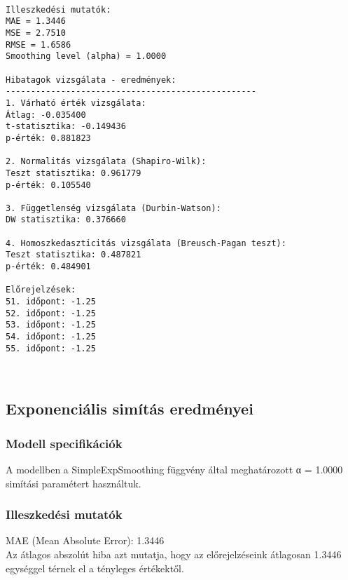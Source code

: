 \documentclass[11pt]{article}
\begin{document}
    \begin{Verbatim}[commandchars=\\\{\}]

Illeszkedési mutatók:
MAE = 1.3446
MSE = 2.7510
RMSE = 1.6586
Smoothing level (alpha) = 1.0000

Hibatagok vizsgálata - eredmények:
--------------------------------------------------
1. Várható érték vizsgálata:
Átlag: -0.035400
t-statisztika: -0.149436
p-érték: 0.881823

2. Normalitás vizsgálata (Shapiro-Wilk):
Teszt statisztika: 0.961779
p-érték: 0.105540

3. Függetlenség vizsgálata (Durbin-Watson):
DW statisztika: 0.376660

4. Homoszkedaszticitás vizsgálata (Breusch-Pagan teszt):
Teszt statisztika: 0.487821
p-érték: 0.484901

Előrejelzések:
51. időpont: -1.25
52. időpont: -1.25
53. időpont: -1.25
54. időpont: -1.25
55. időpont: -1.25
    \end{Verbatim}

    \begin{center}
    \end{center}
    { \hspace*{\fill} \\}
    
    \subsection{Exponenciális simítás
eredményei}\label{exponenciuxe1lis-simuxedtuxe1s-eredmuxe9nyei}

\subsubsection{Modell specifikációk}\label{modell-specifikuxe1ciuxf3k}

A modellben a SimpleExpSmoothing függvény által meghatározott α = 1.0000
simítási paramétert használtuk.

\subsubsection{Illeszkedési mutatók}\label{illeszkeduxe9si-mutatuxf3k}

MAE (Mean Absolute Error): 1.3446\\
Az átlagos abszolút hiba azt mutatja, hogy az előrejelzéseink átlagosan
1.3446 egységgel térnek el a tényleges értékektől.
\end{document}
